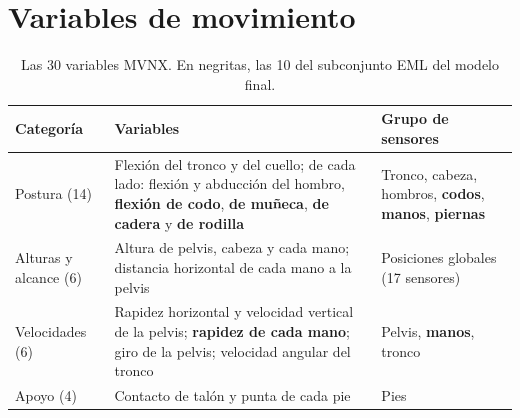 \documentclass[letterpaper,11pt]{article}
\begin{document}
\printbibliography[title={Referencias}]

\clearpage
\appendix

\section{Variables de movimiento}
\label{anx:variables}
\begin{table}[H]
  \centering
  \small
  \caption{Las 30 variables MVNX. En negritas, las 10 del subconjunto EML del modelo final.}
  \begin{tabular}{p{3.0cm}p{8.2cm}p{3.0cm}}
    \toprule
    Categoría & Variables & Grupo de sensores \\
    \midrule
    Postura (14) & Flexión del tronco y del cuello; de cada lado: flexión y abducción del hombro, \textbf{flexión de codo}, \textbf{de muñeca}, \textbf{de cadera} y \textbf{de rodilla} & Tronco, cabeza, hombros, \textbf{codos}, \textbf{manos}, \textbf{piernas} \\
    Alturas y alcance (6) & Altura de pelvis, cabeza y cada mano; distancia horizontal de cada mano a la pelvis & Posiciones globales (17 sensores) \\
    Velocidades (6) & Rapidez horizontal y velocidad vertical de la pelvis; \textbf{rapidez de cada mano}; giro de la pelvis; velocidad angular del tronco & Pelvis, \textbf{manos}, tronco \\
    Apoyo (4) & Contacto de talón y punta de cada pie & Pies \\
    \bottomrule
  \end{tabular}
\end{table}
\end{document}
